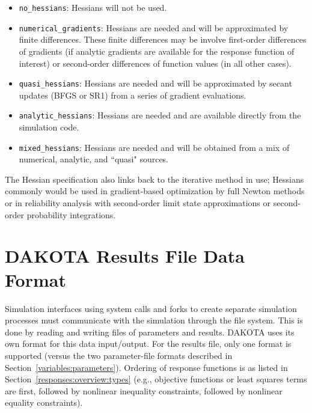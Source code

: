 \begin{itemize}

\item \texttt{no\_hessians}: Hessians will not be used.

\item \texttt{numerical\_gradients}: Hessians are needed and will be
  approximated by finite differences.  These finite differences may be
  involve first-order differences of gradients (if analytic gradients
  are available for the response function of interest) or second-order 
  differences of function values (in all other cases).

\item \texttt{quasi\_hessians}: Hessians are needed and will be 
  approximated by secant updates (BFGS or SR1) from a series of 
  gradient evaluations.

\item \texttt{analytic\_hessians}: Hessians are needed and are
  available directly from the simulation code.

\item \texttt{mixed\_hessians}: Hessians are needed and will be 
  obtained from a mix of numerical, analytic, and ``quasi" sources.

\end{itemize}

The Hessian specification also links back to the iterative method in
use; Hessians commonly would be used in gradient-based
optimization by full Newton methods or in reliability analysis
with second-order limit state approximations or second-order
probability integrations.

\section{DAKOTA Results File Data Format}\label{responses:results}

Simulation interfaces using system calls and forks to create
separate simulation processes must communicate with the simulation
through the file system. This is done by reading and
writing files of parameters and results. DAKOTA uses its own format
for this data input/output. For the results file, only one format is
supported (versus the two parameter-file formats described in
Section~\ref{variables:parameters}). Ordering of response functions is
as listed in Section~\ref{responses:overview:types} (e.g., objective
functions or least squares terms are first, followed by nonlinear
inequality constraints, followed by nonlinear equality constraints).

